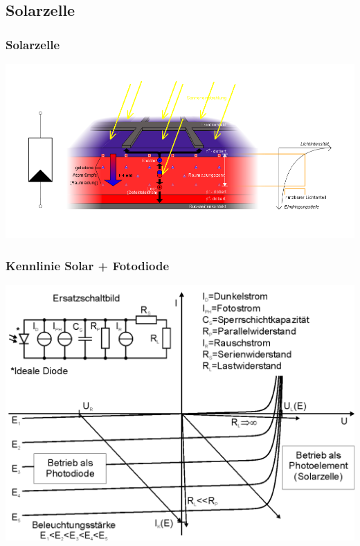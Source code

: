 \subsection*{Solarzelle}
\begin{frame}
    \frametitle{Solarzelle}
        \begin{center}
            \includegraphics[width=1\textwidth,height=.85\textheight,keepaspectratio]{a05/Solarzelle_Funktionsprinzip2.png}\\
            \tiny \hyperlink{refs}{\cite{wm}}
        \end{center}
\end{frame}

\begin{frame}
    \frametitle{Kennlinie Solar + Fotodiode}
        \begin{center}
            \includegraphics[width=1\textwidth,height=.85\textheight,keepaspectratio]{a05/Kennlinie_Photodiode_1.png}\\
            \tiny \hyperlink{refs}{\cite{wm}}
        \end{center}
\end{frame}

